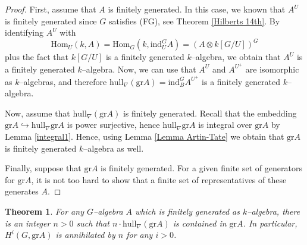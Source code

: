 \documentclass{article}
\theoremstyle{plain}
\newtheorem{Th}{Theorem}[section]
\theoremstyle{definition}
\begin{document}
\begin{proof}
First, assume that $A$ is finitely generated. In this case, we known that $A^U$ is finitely generated since  $G$ satisfies (FG), see Theorem  \ref{Hilberts 14th}.  By identifying $A^U$ with 
\[
\mathrm{Hom}_U(k,A)=\mathrm{Hom}_G(k,\mathrm{ind}_U^G A )= (A\otimes k[G/U])^G
\]
plus the fact that $k[G/U]$ is a finitely generated $k$--algebra, we obtain that $A^U$ is a finitely generated $k$--algebra. Now, we can use that $A^U$ and $A^{U^+}$ are isomorphic as $k$--algebras, and therefore $\mathrm{hull}_\nabla (\mathrm{gr}A)=\mathrm{ind}_B^G A^{U^+}$ is a finitely generated $k$--algebra. 

Now, assume that $\mathrm{hull}_\nabla(\mathrm{gr}A)$ is finitely generated. Recall that the embedding  $\mathrm{gr} A\hookrightarrow \mathrm{hull}_\nabla \mathrm{gr}A$ is power surjective, hence $\mathrm{hull}_\nabla \mathrm{gr}A$ is integral over $\mathrm{gr} A$ by Lemma \ref{integral1}. Hence, using  Lemma \ref{Lemma Artin-Tate} we obtain that $\mathrm{gr}A$ is finitely generated $k$--algebra as well.  

Finally, suppose that $\mathrm{gr}A$ is finitely generated. For a given finite set of generators for $\mathrm{gr} A$, it is not too hard to show that  a finite set of representatives of these generates $A$. 
\end{proof}






\begin{Th}\label{generic good Grosshans}
    For any $G$--algebra $A$ which is finitely generated as $k$--algebra, there is an integer $n>0$ such that $n\cdot  \mathrm{hull}_\nabla(\mathrm{gr} A)$ is contained in $\mathrm{gr}A$. In particular, $H^i(G,\mathrm{gr}A)$ is annihilated by $n$ for any $i>0$.
\end{Th}
\end{document}
